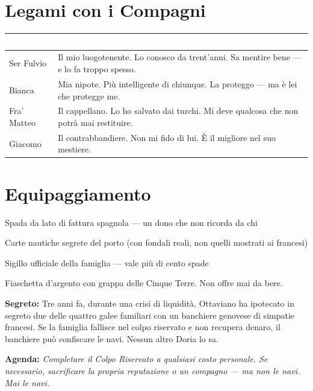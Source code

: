 \section*{Legami con i Compagni}


\begin{table}[h]
\centering\renewcommand{\arraystretch}{1.4}
\begin{tabularx}{\linewidth}{@{}L{2.4cm} X@{}}
  \toprule{}
  \textcolor{white}{\textbf{PG}} & \textcolor{white}{\textbf{Legame}} \\
  \midrule
  Ser Fulvio & Il mio luogotenente. Lo conosco da trent'anni. Sa mentire bene — e lo fa troppo spesso. \\
  Bianca & Mia nipote. Più intelligente di chiunque. La proteggo — ma è lei che protegge me. \\
  Fra' Matteo & Il cappellano. Lo ho salvato dai turchi. Mi deve qualcosa che non potrà mai restituire. \\
  Giacomo & Il contrabbandiere. Non mi fido di lui. È il migliore nel suo mestiere. \\
  \bottomrule
\end{tabularx}
\end{table}

\section*{Equipaggiamento}
\begin{goldlist}
  \item Spada da lato di fattura spagnola — un dono che non ricorda da chi
  \item Carte nautiche segrete del porto (con fondali reali, non quelli mostrati ai francesi)
  \item Sigillo ufficiale della famiglia — vale più di cento spade
  \item Fiaschetta d'argento con grappa delle Cinque Terre. Non offre mai da bere.
\end{goldlist}

\clearpage

\begin{secretbox}
  \textbf{Segreto:} Tre anni fa, durante una crisi di liquidità, Ottaviano ha
  ipotecato in segreto due delle quattro galee familiari con un banchiere
  genovese di simpatie francesi. Se la famiglia fallisce nel colpo riservato
  e non recupera denaro, il banchiere può confiscare le navi. Nessun altro
  Doria lo sa.

  \medskip\noindent\textcolor{SecretRed}{\textbf{Agenda:}}
  \textit{Completare il Colpo Riservato a qualsiasi costo personale. Se
  necessario, sacrificare la propria reputazione o un compagno — ma non le
  navi. Mai le navi.}
\end{secretbox}


